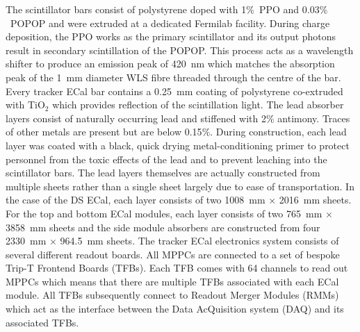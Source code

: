 \newline
\newline
The scintillator bars consist of polystyrene doped with 1$\%$~PPO and 0.03$\%$~POPOP and were extruded at a dedicated Fermilab facility.  During charge deposition, the PPO works as the primary scintillator and its output photons result in secondary scintillation of the POPOP.  This process acts as a wavelength shifter to produce an emission peak of 420~nm which matches the absorption peak of the 1~mm diameter WLS fibre threaded through the centre of the bar.  Every tracker ECal bar contains a 0.25~mm coating of polystyrene co-extruded with TiO$_2$ which provides reflection of the scintillation light.
\newline
\newline
The lead absorber layers consist of naturally occurring lead and stiffened with 2$\%$ antimony.  Traces of other metals are present but are below 0.15$\%$.  During construction, each lead layer was coated with a black, quick drying metal-conditioning primer to protect personnel from the toxic effects of the lead and to prevent leaching into the scintillator bars.  The lead layers themselves are actually constructed from multiple sheets rather than a single sheet largely due to ease of transportation.  In the case of the DS ECal, each layer consists of two 1008~mm $\times$ 2016~mm sheets.  For the top and bottom ECal modules, each layer consists of two 765~mm $\times$ 3858~mm sheets and the side module absorbers are constructed from four 2330~mm $\times$ 964.5~mm sheets.
\newline
\newline
The tracker ECal electronics system consists of several different readout boards.  All MPPCs are connected to a set of bespoke Trip-T\cite{Estrada:2003fh} Frontend Boards (TFBs).  Each TFB comes with 64 channels to read out MPPCs which means that there are multiple TFBs associated with each ECal module.  All TFBs subsequently connect to Readout Merger Modules (RMMs) which act as the interface between the Data AcQuisition system (DAQ) and its associated TFBs.

